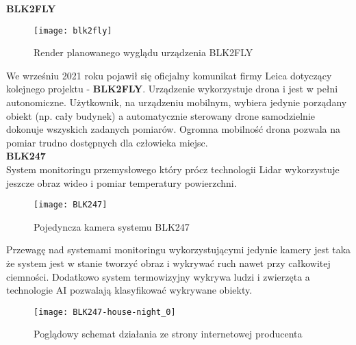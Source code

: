 \textbf{BLK2FLY}

\begin{figure}[h]
    \centering
    \texttt{[image: blk2fly]}
    \caption{Render planowanego wyglądu urządzenia BLK2FLY \cite{blk2fly}}
    \label{fig:blk2fly}
\end{figure}

We wrześniu 2021 roku pojawił się oficjalny komunikat firmy Leica dotyczący kolejnego projektu - \textbf{BLK2FLY}. Urządzenie wykorzystuje drona i jest w pełni autonomiczne. Użytkownik, na urządzeniu mobilnym, wybiera jedynie porządany obiekt (np. cały budynek) a automatycznie sterowany drone samodzielnie dokonuje wszyskich zadanych pomiarów. Ogromna mobilność drona pozwala na pomiar trudno dostępnych dla człowieka miejsc.\\

\textbf{BLK247}\\
System monitoringu przemysłowego który prócz technologii Lidar wykorzystuje jeszcze obraz wideo i pomiar temperatury powierzchni.\\
\begin{figure}[h]
    \centering
    \texttt{[image: BLK247]}
    \caption{Pojedyncza kamera systemu BLK247 \cite{blk247}}
    \label{fig:blk247}
\end{figure}
Przewagę nad systemami monitoringu wykorzystującymi jedynie kamery jest taka że system jest w stanie tworzyć obraz i wykrywać ruch nawet przy całkowitej ciemności. Dodatkowo system termowizyjny wykrywa ludzi i zwierzęta a technologie AI pozwalają klasyfikować wykrywane obiekty.

\begin{figure}[h]
    \centering
    \texttt{[image: BLK247-house-night\_0]}
    \caption{Poglądowy schemat działania ze strony internetowej producenta \cite{blk247}}
    \label{fig:house-night}
\end{figure}


